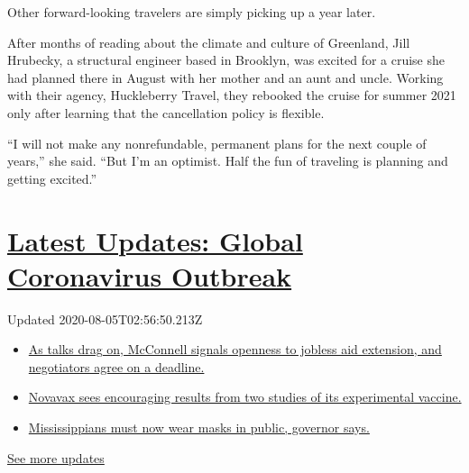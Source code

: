 Other forward-looking travelers are simply picking up a year later.

After months of reading about the climate and culture of Greenland, Jill
Hrubecky, a structural engineer based in Brooklyn, was excited for a
cruise she had planned there in August with her mother and an aunt and
uncle. Working with their agency, Huckleberry Travel, they rebooked the
cruise for summer 2021 only after learning that the cancellation policy
is flexible.

``I will not make any nonrefundable, permanent plans for the next couple
of years,'' she said. ``But I'm an optimist. Half the fun of traveling
is planning and getting excited.''

\hypertarget{latest-updates-global-coronavirus-outbreak}{%
\section{\texorpdfstring{\href{https://www.nytimes.com/2020/08/04/world/coronavirus-cases.html?action=click\&pgtype=Article\&state=default\&region=MAIN_CONTENT_1\&context=storylines_live_updates}{Latest
Updates: Global Coronavirus
Outbreak}}{Latest Updates: Global Coronavirus Outbreak}}\label{latest-updates-global-coronavirus-outbreak}}

Updated 2020-08-05T02:56:50.213Z

\begin{itemize}
\tightlist
\item
  \href{https://www.nytimes.com/2020/08/04/world/coronavirus-cases.html?action=click\&pgtype=Article\&state=default\&region=MAIN_CONTENT_1\&context=storylines_live_updates\#link-762df92}{As
  talks drag on, McConnell signals openness to jobless aid extension,
  and negotiators agree on a deadline.}
\item
  \href{https://www.nytimes.com/2020/08/04/world/coronavirus-cases.html?action=click\&pgtype=Article\&state=default\&region=MAIN_CONTENT_1\&context=storylines_live_updates\#link-1228a480}{Novavax
  sees encouraging results from two studies of its experimental
  vaccine.}
\item
  \href{https://www.nytimes.com/2020/08/04/world/coronavirus-cases.html?action=click\&pgtype=Article\&state=default\&region=MAIN_CONTENT_1\&context=storylines_live_updates\#link-794484ed}{Mississippians
  must now wear masks in public, governor says.}
\end{itemize}

\href{https://www.nytimes.com/2020/08/04/world/coronavirus-cases.html?action=click\&pgtype=Article\&state=default\&region=MAIN_CONTENT_1\&context=storylines_live_updates}{See
more updates}

